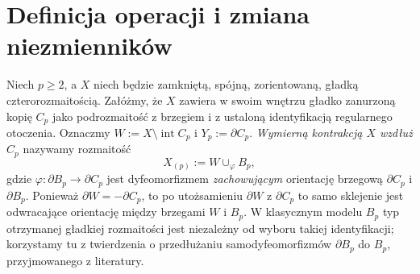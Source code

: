\section{Definicja operacji i zmiana niezmienników}
\label{sec:tg-rb-definition}

\begin{definicja}
\label{def:tg-rb-operation}
Niech $p\geq2$, a $X$ niech będzie zamkniętą,
spójną, zorientowaną, gładką czterorozmaitością.
Załóżmy, że $X$ zawiera w swoim wnętrzu
gładko zanurzoną kopię $C_p$ jako podrozmaitość
z brzegiem i z ustaloną identyfikacją
regularnego otoczenia. Oznaczmy
$W:=X\setminus\operatorname{int}C_p$ i
$Y_p:=\partial C_p$.
\emph{Wymierną kontrakcją $X$ wzdłuż $C_p$}
nazywamy rozmaitość
\[
X_{(p)}:=W\cup_{\varphi}B_p,
\]
gdzie $\varphi:\partial B_p\to\partial C_p$ jest
dyfeomorfizmem \emph{zachowującym} orientację
brzegową $\partial C_p$ i $\partial B_p$.
Ponieważ $\partial W=-\partial C_p$, to po
utożsamieniu $\partial W$ z $\partial C_p$
to samo sklejenie jest odwracające orientację
między brzegami $W$ i $B_p$.
W klasycznym modelu $B_p$ typ otrzymanej
gładkiej rozmaitości jest niezależny od wyboru
takiej identyfikacji; korzystamy tu z twierdzenia
o przedłużaniu samodyfeomorfizmów $\partial B_p$
do $B_p$, przyjmowanego z literatury.
\end{definicja}

\begin{center}
\end{center}

